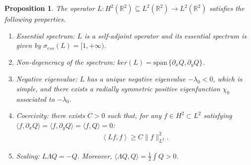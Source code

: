 \documentclass[reqno,10pt]{amsart}
\newtheorem{propo}[lemm]{Proposition}
\numberwithin{equation}{section}
\begin{document}
	\begin{propo}\label{prop:L} The operator $L: H^2(\mathbb R^2) \subseteq L^2(\mathbb R^2) \to L^2(\mathbb R^2)$ satisfies the following properties.
		\begin{enumerate}
			\item[(i)] \emph{Essential spectrum:} $L$ is a self-adjoint operator and its essential spectrum is given by $ \sigma_{ess}(L) = [1,+\infty)$. 
			\item[(ii)] \emph{Non-degeneracy of the spectrum:} $ ker(L) = \text{span} \, \{\partial_x Q, \partial_y Q\}$.
			\item[(iii)] \emph{Negative eigenvalue:} $L$ has a unique negative eigenvalue $-\lambda_0<0$, which is simple, and there exists a radially symmetric positive eigenfunction $\chi_0$associated to $-\lambda_0$. 
			\item[(iv)] \emph{Coercivity:} there exists $C>0$ such that, for any $f\in H^2 \subset L^2$ satisfying $\langle f, \partial_xQ \rangle=\langle f, \partial_yQ \rangle=\langle f, Q \rangle =0$:
			\begin{align*}
				\left\langle L f,f \right\rangle \geq C \| f \|_{L^2}^2.
			\end{align*}
			\item[(v)]\emph{Scaling:} 
			$L\Lambda Q=-Q$. Moreover,  $\langle \Lambda Q , Q \rangle=\frac12 \int Q >0$.
		\end{enumerate}
	\end{propo}
	
\end{document}
